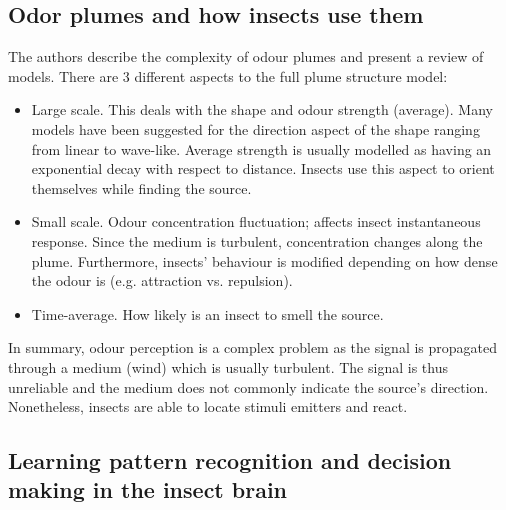 \documentclass[11pt,a4paper]{article}
\begin{document}
    \subsection{Odor plumes and how insects use them}
    The authors describe the complexity of odour plumes and present a review of models. 
    There are 3 different aspects to the full plume structure model:
    \begin{itemize}
      \item Large scale. 
      This deals with the shape and odour strength (average). 
      Many models have been suggested for the direction aspect of the shape ranging from linear to wave-like. 
      Average strength is usually modelled as having an exponential decay with respect to distance.
      Insects use this aspect to orient themselves while finding the source. 
      
      \item Small scale. Odour concentration fluctuation; affects insect instantaneous response.
      Since the medium is turbulent, concentration changes along the plume. 
      Furthermore, insects' behaviour is modified depending on how dense the odour is (e.g. attraction vs. repulsion). 
      
      \item Time-average. How likely is an insect to smell the source.
      
    \end{itemize}
    In summary, odour perception is a complex problem as the signal is propagated through a medium (wind) which is usually turbulent. 
    The signal is thus unreliable and the medium does not commonly indicate the source's direction.
    Nonetheless, insects are able to locate stimuli emitters and react.
   \subsection{Learning pattern recognition and decision making in the insect brain}
   
\end{document}
